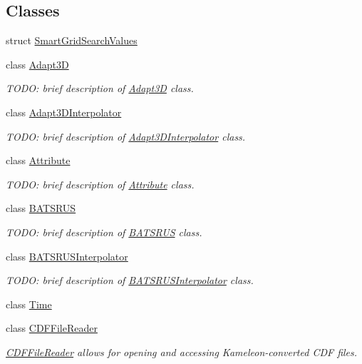 \subsection*{Classes}
\begin{DoxyCompactItemize}
\item 
struct \hyperlink{structccmc_1_1_smart_grid_search_values}{Smart\-Grid\-Search\-Values}
\item 
class \hyperlink{classccmc_1_1_adapt3_d}{Adapt3\-D}
\begin{DoxyCompactList}\small\item\em T\-O\-D\-O\-: brief description of \hyperlink{classccmc_1_1_adapt3_d}{Adapt3\-D} class. \end{DoxyCompactList}\item 
class \hyperlink{classccmc_1_1_adapt3_d_interpolator}{Adapt3\-D\-Interpolator}
\begin{DoxyCompactList}\small\item\em T\-O\-D\-O\-: brief description of \hyperlink{classccmc_1_1_adapt3_d_interpolator}{Adapt3\-D\-Interpolator} class. \end{DoxyCompactList}\item 
class \hyperlink{classccmc_1_1_attribute}{Attribute}
\begin{DoxyCompactList}\small\item\em T\-O\-D\-O\-: brief description of \hyperlink{classccmc_1_1_attribute}{Attribute} class. \end{DoxyCompactList}\item 
class \hyperlink{classccmc_1_1_b_a_t_s_r_u_s}{B\-A\-T\-S\-R\-U\-S}
\begin{DoxyCompactList}\small\item\em T\-O\-D\-O\-: brief description of \hyperlink{classccmc_1_1_b_a_t_s_r_u_s}{B\-A\-T\-S\-R\-U\-S} class. \end{DoxyCompactList}\item 
class \hyperlink{classccmc_1_1_b_a_t_s_r_u_s_interpolator}{B\-A\-T\-S\-R\-U\-S\-Interpolator}
\begin{DoxyCompactList}\small\item\em T\-O\-D\-O\-: brief description of \hyperlink{classccmc_1_1_b_a_t_s_r_u_s_interpolator}{B\-A\-T\-S\-R\-U\-S\-Interpolator} class. \end{DoxyCompactList}\item 
class \hyperlink{classccmc_1_1_time}{Time}
\item 
class \hyperlink{classccmc_1_1_c_d_f_file_reader}{C\-D\-F\-File\-Reader}
\begin{DoxyCompactList}\small\item\em \hyperlink{classccmc_1_1_c_d_f_file_reader}{C\-D\-F\-File\-Reader} allows for opening and accessing Kameleon-\/converted C\-D\-F files. \end{DoxyCompactList}\item 

\end{DoxyCompactItemize}

